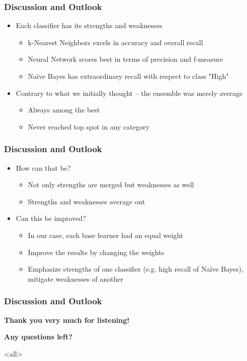 \mode*
\begin{frame}
  \frametitle{Discussion and Outlook}
  \onslide<+->
  \begin{itemize}
    \item<+-> Each classifier has its strengths and weaknesses
      \begin{itemize}
        \item<+-> k-Nearest Neighbors excels in accuracy and overall recall
        \item<+-> Neural Network scores best in terms of precision and f-measure
        \item<+-> Na\"ive Bayes has extraordinary recall with respect to class "High"
      \end{itemize}
    \item<+-> Contrary to what we initially thought -- the ensemble was merely average
      \begin{itemize}
        \item<+-> Always among the best
        \item<+-> Never reached top spot in any category
      \end{itemize}
  \end{itemize}
\end{frame}

\begin{frame}
	\frametitle{Discussion and Outlook}
	\onslide<+->
	\begin{itemize}
		\item<+-> How can that be?
		\begin{itemize}
			\item<+-> Not only strengths are merged but weaknesses as well
			\item<+-> Strengths and weaknesses average out
		\end{itemize}
		\item<+-> Can this be improved?
		\begin{itemize}
			\item<+-> In our case, each base learner had an equal weight
			\item<+-> Improve the results by changing the weights
			\item<+-> Emphasize strengths of one classifier (e.g. high recall
			of Na\"ive Bayes), mitigate weaknesses of another
		\end{itemize}
	\end{itemize}
\end{frame}

\begin{frame}[c]
  \frametitle{Discussion and Outlook}
  \center
  \textbf{Thank you very much for listening!}
  
  \textbf{Any questions left?}
\end{frame}
\mode<all>